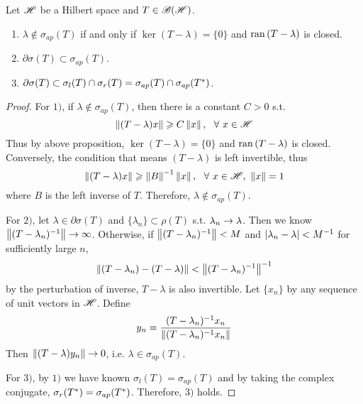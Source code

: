 \documentclass[a4paper,11pt]{report}
\begin{document}
\begin{prop} \label{prop16}
	Let $\mathscr{H}$ be a Hilbert space and $T \in \mathscr{B(H)}$.
	\begin{enumerate}
		\item $\lambda \notin \sigma_{ap}(T)$ if and only if $\ker{(T - \lambda)}=\{0\}$ and $\operatorname{ran}{(T - \lambda)}$ is closed.
		\item $\partial \sigma(T) \subset \sigma_{ap}(T)$.
		\item $\partial \sigma(T) \subset \sigma_l(T) \cap \sigma_r(T) = \sigma_{ap}(T) \cap \sigma_{ap}(T^{*})$.
	\end{enumerate}
\end{prop}
\begin{proof}
	For $1)$, if $\lambda \notin \sigma_{ap}(T)$, then there is a constant $C > 0$ s.t.
	\begin{equation*}
		\left\lVert(T-\lambda)x\right\lVert \geqslant C\left\lVert x\right\lVert,~~\forall~x \in \mathscr{H}
	\end{equation*}
	Thus by above proposition, $\ker{(T - \lambda)}=\{0\}$ and $\operatorname{ran}{(T - \lambda)}$ is closed. Conversely, the condition that means $(T-\lambda)$ is left invertible, thus 
	\begin{equation*}
		\left\lVert(T-\lambda)x\right\lVert \geqslant \left\lVert B\right\lVert^{-1}\left\lVert x\right\lVert,~~\forall~ x \in \mathscr{H},~\left\lVert x\right\lVert=1
	\end{equation*}
	where $B$ is the left inverse of $T$. Therefore, $\lambda \notin \sigma_{ap}(T)$.
	\item For $2)$, let $\lambda \in \partial \sigma(T)$ and $\{\lambda_n\} \subset \rho(T)$ s.t. $\lambda_n \rightarrow \lambda$. Then we know $\left\lVert(T-\lambda_n)^{-1}\right\lVert \rightarrow \infty$. Otherwise, if $\left\lVert(T-\lambda_n)^{-1}\right\lVert < M$ and $\left\lvert\lambda_n-\lambda\right\lvert < M^{-1}$ for sufficiently large $n$,
	\begin{equation*}
		\left\lVert(T-\lambda_n)-(T-\lambda)\right\lVert < \left\lVert(T-\lambda_n)^{-1}\right\lVert^{-1}
	\end{equation*}
	by the perturbation of inverse, $T-\lambda$ is also invertible. Let $\{x_n\}$ by any sequence of unit vectors in $\mathscr{H}$. Define
	\begin{equation}
		y_n = \frac{(T-\lambda_n)^{-1}x_n}{\left\lVert(T-\lambda_n)^{-1}x_n\right\lVert}
	\end{equation}
	Then $\left\lVert(T-\lambda)y_n\right\lVert \rightarrow 0$, i.e. $\lambda \in \sigma_{ap}(T)$.
	\item For $3)$, by $1)$ we have known $\sigma_l(T)=\sigma_{ap}(T)$ and by taking the complex conjugate, $\sigma_r(T^{*})=\sigma_{ap}(T^{*})$. Therefore, $3)$ holds.
\end{proof}
\end{document}
